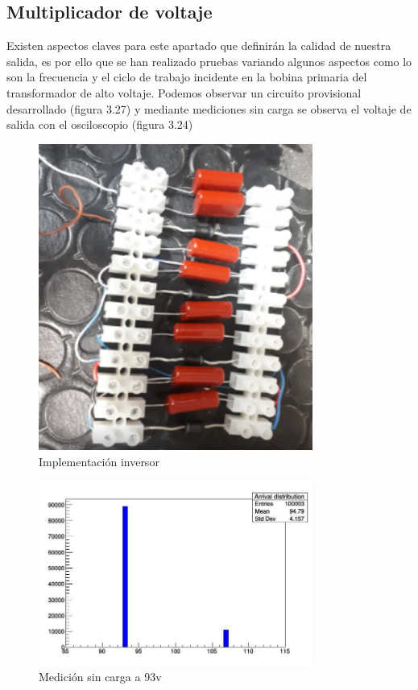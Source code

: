 \subsection{Multiplicador de voltaje}

Existen aspectos claves para este apartado que definirán la calidad de nuestra salida, es por ello que se han realizado pruebas variando algunos aspectos como lo son la frecuencia y el ciclo de trabajo incidente en la bobina primaria del transformador de alto voltaje. Podemos observar un circuito provisional desarrollado (figura 3.27) y mediante mediciones sin carga se observa el voltaje de salida con el osciloscopio (figura 3.24)

\begin{figure}[H]
\centering
\includegraphics[width=9cm]{Capitulo3/figs/fotomulti.png}
\caption{Implementación inversor}
\end{figure}

\begin{figure}[H]
\centering
\includegraphics[width=9cm]{Capitulo3/figs/93V.jpg}
\caption{Medición sin carga a 93v}
\end{figure}

